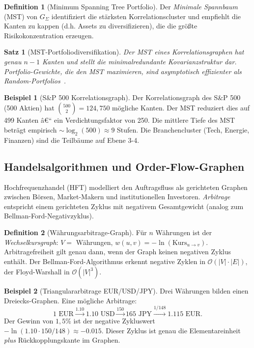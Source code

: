 ﻿\documentclass[12pt,a4paper,twoside]{article}
\theoremstyle{definition}
\newtheorem{definition}{Definition}[section]
\newtheorem{beispiel}{Beispiel}[section]
\theoremstyle{plain}
\newtheorem{theorem}{Satz}[section]
\theoremstyle{remark}
\begin{document}
\begin{definition}[Minimum Spanning Tree Portfolio]
Der \emph{Minimale Spannbaum} (MST) von $G_\Sigma$ identifiziert
die stärksten Korrelationscluster und empfiehlt die Kanten
zu kappen (d.h. Assets zu diversifizieren), die die größte
Risikokonzentration erzeugen.
\end{definition}

\begin{theorem}[MST-Portfoliodiversifikation]
Der MST eines Korrelationsgraphen hat genau $n-1$ Kanten
und stellt die minimalredundante Kovarianzstruktur dar.
Portfolio-Gewichte, die den MST maximieren, sind asymptotisch
effizienter als Random-Portfolios~\cite{Mantegna1999}.
\end{theorem}

\begin{beispiel}[S\&P 500 Korrelationsgraph]
Der Korrelationsgraph des S\&P 500 (500 Aktien) hat
$\binom{500}{2} = 124{,}750$ mögliche Kanten.  Der MST
reduziert dies auf 499 Kanten â€“ ein Verdichtungsfaktor von
250.  Die mittlere Tiefe des MST beträgt empirisch
$\sim \log_2(500) \approx 9$ Stufen.  Die Branchencluster
(Tech, Energie, Finanzen) sind die Teilbäume auf Ebene 3-4.
\end{beispiel}

\subsection{Handelsalgorithmen und Order-Flow-Graphen}

Hochfrequenzhandel (HFT) modelliert den Auftragsfluss als
gerichteten Graphen zwischen Börsen, Market-Makern und
institutionellen Investoren.  \emph{Arbitrage} entspricht einem
gerichteten Zyklus mit negativem Gesamtgewicht (analog
zum Bellman-Ford-Negativzyklus).

\begin{definition}[Währungsarbitrage-Graph]
Für $n$ Währungen ist der \emph{Wechselkursgraph}:
$V = $ Währungen, $w(u,v) = -\ln(\text{Kurs}_{u \to v})$.
Arbitragefreiheit gilt genau dann, wenn der Graph
keinen negativen Zyklus enthält.  Der Bellman-Ford-Algorithmus
erkennt negative Zyklen in $\mathcal{O}(|V| \cdot |E|)$,
der Floyd-Warshall in $\mathcal{O}(|V|^3)$.
\end{definition}

\begin{beispiel}[Triangulararbitrage EUR/USD/JPY]
Drei Währungen bilden einen Dreiecks-Graphen.  Eine mögliche
Arbitrage:
\[
  1 \text{ EUR} \xrightarrow{1{.}10} 1{.}10 \text{ USD}
  \xrightarrow{150} 165 \text{ JPY}
  \xrightarrow{1/148} 1{.}115 \text{ EUR}.
\]
Der Gewinn von $1{,}5\%$ ist der negative Zykluswert
$-\ln(1{.}10 \cdot 150 / 148) \approx -0{.}015$.
Dieser Zyklus ist genau die Elementareinheit \emph{plus}
Rückkopplungskante im Graphen.
\end{beispiel}
\end{document}
